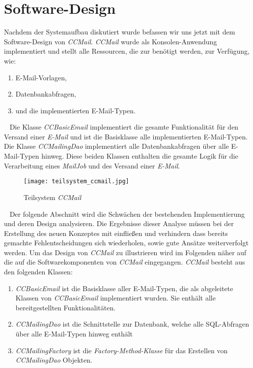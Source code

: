\section{Software-Design}
\label{sec:ccmail-software-design}
Nachdem der Systemaufbau diskutiert wurde befassen wir uns jetzt mit dem Software-Design von \emph{CCMail}. \emph{CCMail} wurde als Konsolen-Anwendung implementiert und stellt alle Ressourcen, die zur benötigt werden, zur Verfügung, wie:
\begin{enumerate}
	\item E-Mail-Vorlagen,
	\item Datenbankabfragen,
	\item und die implementierten E-Mail-Typen.
\end{enumerate}
\ \newline
Die Klasse \emph{CCBasicEmail} implementiert die gesamte Funktionalität für den Versand einer \emph{E-Mail} und ist die Basisklasse alle implementierten E-Mail-Typen. Die Klasse \emph{CCMailingDao} implementiert alle Datenbankabfragen über alle E-Mail-Typen hinweg. Diese beiden Klassen enthalten die gesamte Logik für die Verarbeitung eines \emph{MailJob} und des Versand einer \emph{E-Mail}.
\begin{figure}[h]
\centering
\texttt{[image: teilsystem\_ccmail.jpg]} 
\caption{Teilsystem \emph{CCMail}}
\label{fig:ccmail-teilsystem}
\end{figure}
\ \newline
Der folgende Abschnitt wird die Schwächen der bestehenden Implementierung und deren Design analysieren. Die Ergebnisse dieser Analyse müssen bei der Erstellung des neuen Konzeptes mit einfließen und verhindern dass bereits gemachte Fehlentscheidungen sich wiederholen, sowie gute Ansätze weiterverfolgt werden.
\newline
\newline
Um das Design von \emph{CCMail} zu illustrieren wird im Folgenden näher auf die auf die Softwarekomponenten von \emph{CCMail} eingegangen. \emph{CCMail} besteht aus den folgenden Klassen:
\begin{enumerate}
	\item\emph{CCBasicEmail} ist die Basisklasse aller E-Mail-Typen, die als abgeleitete Klassen von \emph{CCBasicEmail} implementiert wurden. Sie enthält alle bereitgestellten Funktionalitäten.
	\item\emph{CCMailingDao} ist die Schnittstelle zur Datenbank, welche alle SQL-Abfragen über alle E-Mail-Typen hinweg enthält
	\item\emph{CCMailingFactory} ist die \emph{Factory-Method-Klasse} für das Erstellen von \emph{CCMailingDao} Objekten.
\end{enumerate}
\newpage

